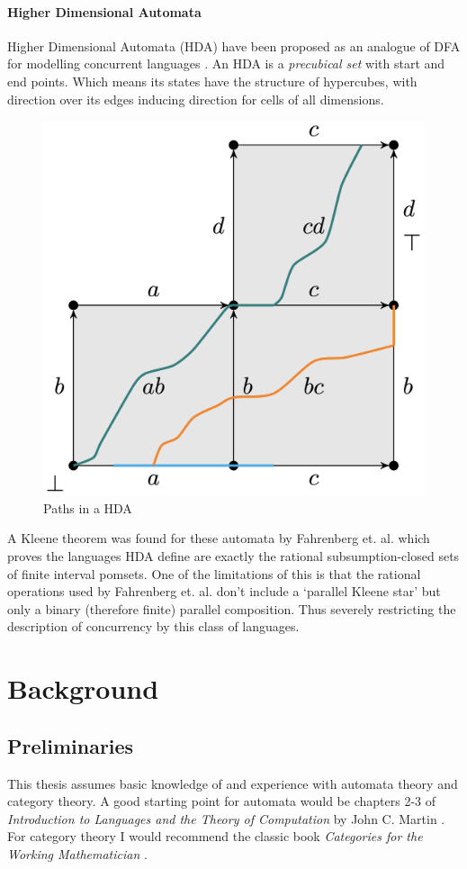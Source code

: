 \documentclass[12pt]{article}
\theoremstyle{definition}
\newcommand{\1}{\mathbbm{1}}
\begin{document}
\paragraph{Higher Dimensional Automata}
Higher Dimensional Automata (HDA) have been proposed as an analogue of DFA for modelling concurrent languages \cite{Pra91, vG91}. An HDA is a \emph{precubical set} with start and end points. Which means its states have the structure of hypercubes, with direction over its edges inducing direction for cells of all dimensions.
\begin{figure}[H]\label{fig:HDA_paths}
    \centering
    \includegraphics[width=0.5\linewidth]{HDA_paths.png}
    \caption{Paths in a HDA}
\end{figure}

A Kleene theorem was found for these automata by Fahrenberg et. al. \cite{Fahr_2024} which proves the languages HDA define are exactly the rational subsumption-closed sets of finite interval pomsets. One of the limitations of this is that the rational operations used by Fahrenberg et. al. don't include a `parallel Kleene star' but only a binary (therefore finite) parallel composition. Thus severely restricting the description of concurrency by this class of languages.
\newpage
\section{Background}
\subsection{Preliminaries}
This thesis assumes basic knowledge of and experience with automata theory and category theory. A good starting point for automata would be chapters 2-3 of \emph{Introduction to Languages and the Theory of Computation} by John C. Martin \cite{Martin_2011}. For category theory I would recommend the classic book \emph{Categories for the Working Mathematician} \cite{MacLane1998}.
\end{document}
